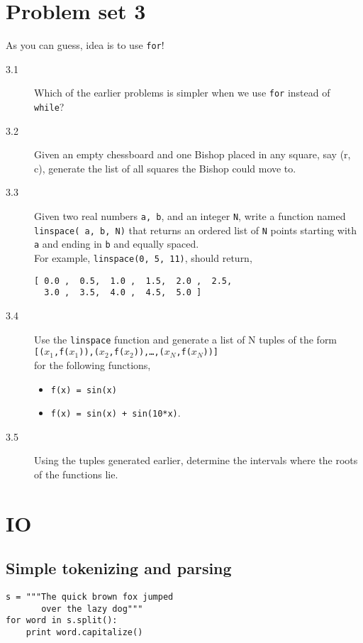\documentclass[12pt]{article}
\begin{document}
\section{Problem set 3}
  As you can guess, idea is to use \texttt{for}!

\begin{description}
  \item[3.1] Which of the earlier problems is simpler when we use \texttt{for} instead of \texttt{while}? 
  \item[3.2] Given an empty chessboard and one Bishop placed in any square, say (r, c), generate the list of all squares the Bishop could move to.
  \item[3.3] Given two real numbers \texttt{a, b}, and an integer \texttt{N}, write a
  function named \texttt{linspace( a, b, N)} that returns an ordered list
  of \texttt{N} points starting with \texttt{a} and ending in \texttt{b} and
  equally spaced.\\
  For example, \texttt{linspace(0, 5, 11)}, should return, \\
\begin{verbatim}
[ 0.0 ,  0.5,  1.0 ,  1.5,  2.0 ,  2.5,  
  3.0 ,  3.5,  4.0 ,  4.5,  5.0 ]
\end{verbatim}
  \item[3.4] Use the \texttt{linspace} function and generate a list of N tuples of the form\\
\texttt{[($x_1$,f($x_1$)),($x_2$,f($x_2$)),\ldots,($x_N$,f($x_N$))]}\\for the following functions,
\begin{itemize}
  \item \texttt{f(x) = sin(x)}
  \item \texttt{f(x) = sin(x) + sin(10*x)}.
\end{itemize}

\item[3.5] Using the tuples generated earlier, determine the intervals where the roots of the functions lie.
\end{description}

\section{IO}
  \subsection{Simple tokenizing and parsing}
  \begin{verbatim}
s = """The quick brown fox jumped
       over the lazy dog"""
for word in s.split():
    print word.capitalize()
  \end{verbatim}
\end{document}

